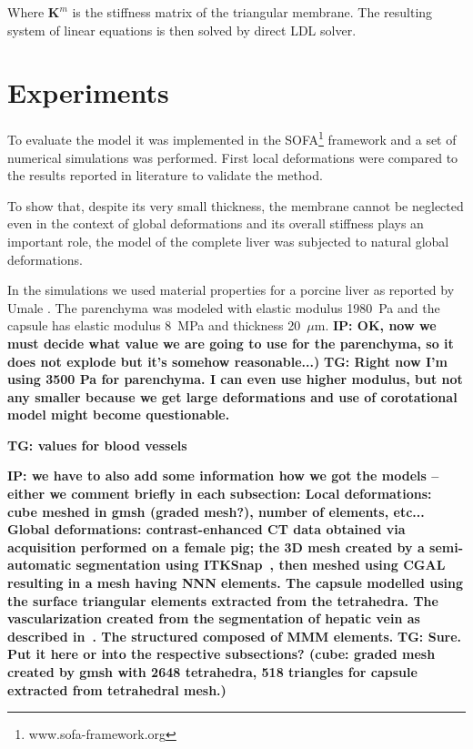 \documentclass{llncs}
\newcommand{\TG}[1]{{\color{blue}\textbf{TG: #1}}}
\newcommand{\IP}[1]{{\color{cyan}\textbf{IP: #1}}}
\newcommand{\Mat}[1]{\mathbf{#1}}
\begin{document}
Where $\Mat{K}^m$ is the stiffness matrix of the triangular membrane.
The resulting
system of linear equations is then solved by direct LDL solver.




\section{Experiments} %

To evaluate the model it was implemented in the
SOFA\footnote{www.sofa-framework.org} framework and a set of
numerical simulations was performed. First local deformations were compared to the
results reported in literature to validate the method.

To show that, despite its very small thickness, the membrane cannot be
neglected even in the context of global deformations and its overall
stiffness plays an important role, the model of
the complete liver was subjected to natural global deformations.

In the simulations we used material properties for a porcine liver as
reported by Umale \cite{Umale2013}. The
parenchyma was modeled with elastic modulus 1980~Pa and the capsule has
elastic modulus 8~MPa and thickness 20~$\mu$m.
\IP{OK, now we must decide what value we are going to use for the parenchyma, so it does not explode but it's somehow reasonable...)}
\TG{Right now I'm using 3500 Pa for parenchyma. I can even use higher
modulus, but not any smaller because we get large deformations and use of
corotational model might become questionable.}

\TG{values for blood vessels}

\IP{we have to also add some information how we got the models -- either we comment briefly in each subsection:
Local deformations: cube meshed in gmsh (graded mesh?), number of elements, etc...
Global deformations: contrast-enhanced CT data obtained via acquisition performed on a female pig; the 3D mesh created by a
semi-automatic segmentation using ITKSnap~\cite{itksnap}, then meshed using CGAL~\cite{cgal-meshingAlg} resulting in a mesh having 
NNN elements. The capsule modelled using the surface triangular elements extracted from the tetrahedra. The vascularization 
created from the segmentation of hepatic vein as described in~\cite{Peterlik2012}. The structured composed of MMM elements.}
\TG{Sure. Put it here or into the respective subsections? (cube: graded
  mesh created by gmsh with 2648 tetrahedra, 518 triangles for capsule
extracted from tetrahedral mesh.)}
\end{document}
